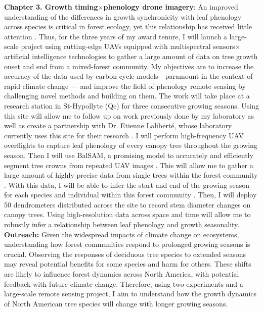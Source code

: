 \documentclass[12pt]{article}
\begin{document}
\textbf{Chapter 3. Growth timing$\times$phenology drone imagery}:
An improved understanding of the differences in growth synchronicity with leaf phenology across species is critical in forest ecology, yet this relationship has received little attention \cite{klein_coordination_2016,kramer_importance_2000}. Thus, for the three years of my award tenure, I will launch a large-scale project using cutting-edge UAVs equipped with multispectral sensors$\times$artificial intelligence technologies \cite{ball_accurate_2023,teng_bringing_2025,ulku_deep_2022} to gather a large amount of data on tree growth onset and end from a mixed-forest community. My objectives are to increase the accuracy of the data used by carbon cycle models---paramount in the context of rapid climate change \cite{richardson_climate_2013,swidrak_comparing_2013}--- and improve the field of phenology remote sensing by challenging novel methods and building on them. The work will take place at a research station in St-Hypollyte (Qc) for three consecutive growing seasons. Using this site will allow me to follow up on work previously done by my laboratory \cite{flynn_temperature_2018} as well as create a partnership with Dr. Etienne Laliberté, whose laboratory currently uses this site for their research \cite{cloutier_influence_2024}. I will perform high-frequency UAV overflights to capture leaf phenology of every canopy tree throughout the growing season. Then I will use BalSAM, a promising model to accurately and efficiently segment tree crowns from repeated UAV images \cite{teng_bringing_2025}. This will allow me to gather a large amount of highly precise data from single trees within the forest community \cite{teng_bringing_2025}. With this data, I will be able to infer the start and end of the growing season for each species and individual within this forest community \cite{berra_assessing_2019,fawcett_monitoring_2021}. Then, I will deploy 50 dendrometers distributed across the site to record stem diameter changes on canopy trees. Using high-resolution data across space and time will allow me to robustly infer a relationship between leaf phenology and growth seasonality.\\
\textbf{Outreach:}
Given the widespread impacts of climate change on ecosystems, understanding how forest communities respond to prolonged growing seasons is crucial. Observing the responses of deciduous tree species to extended seasons may reveal potential benefits for some species and harm for others. These shifts are likely to influence forest dynamics across North America, with potential feedback with future climate change. Therefore, using two experiments and a large-scale remote sensing project, I aim to understand how the growth dynamics of North American tree species will change with longer growing seasons.  

\newpage


\end{document}
